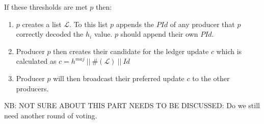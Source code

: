 If these thresholds are met $p$ then:
\begin{enumerate}
\item $p$ creates a list $\mathcal{L}$. To this list $p$ appends the $PId$ of any producer that $p$ correctly decoded the $h_i$ value. $p$ should append their own $PId$.
\item Producer $p$ then creates their candidate for the ledger update $c$ which is calculated as $c = h^{maj}~||~\#(\mathcal{L})~||~Id$
\item Producer $p$ will then broadcast their preferred update $c$ to the other producers.
\end{enumerate}


NB: NOT SURE ABOUT THIS PART NEEDS TO BE DISCUSSED: Do we still need another round of voting. 



\begin{comment}

 Each $h$ within $G$ contains a producer's hash of the proposed update ($u$ and a peer identifier ($Id$). The most popular $u$ value can be found, which gives us $u^{maj}$, and from there the subset $G_{maj}$ can be created, which is the amount of votes for the most popular update. Two thresholds must be considered first are $G_{min}$, the minimum amount of updates it has received from other producers in order to generate a valid candidate, and $G_{thresh}$, the threshold value for which a minimum number of votes must be in favor of $G_{maj}$ (the most popular vote found within $G$). So in order to proceed with declaring a candidate the requirements, $G > $ and $G_{maj} > G_{thresh}$ must be met. \\ 

If the thresholds are met the following can take place:

\begin{enumerate}
\item $p$ creates a list $\mathcal{L}(prod)$. To this list $p$ appends the identifier of any producer that correctly sent the $u$ value that equals $u^{maj}$. If $p$'s $u$ value is also the same as $u^{maj}$ then they should append their own $Id$.
\item Producer $p$ then creates their candidate for the ledger update $c$ which is calculated as $c = u^{maj}~||~\#(\mathcal{L}(prod))~||~Id$
\item Producer $p$ will then broadcast their preferred update $c$ to the other producers.
\end{enumerate}

$p$ during this phase will be collecting the $c$ values from other producers. At the end of this phase of the cycle $p$ will hold a set of $C$ candidates.


\end{comment}